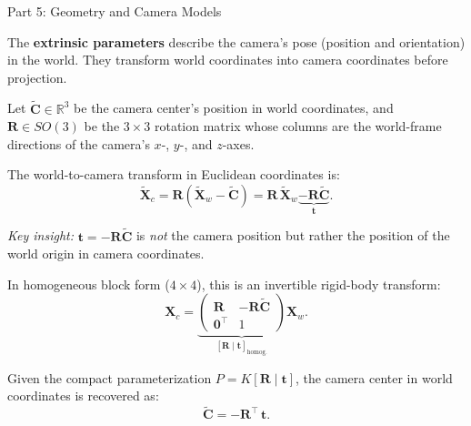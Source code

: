 \documentclass[letterpaper]{article}
\begin{document}
\begin{notes}{Part 5: Geometry and Camera Models}


The \textbf{extrinsic parameters} describe the camera's pose (position and
orientation) in the world.  They transform world coordinates into camera
coordinates before projection.

Let $\widetilde{\mathbf{C}} \in \mathbb{R}^3$ be the camera center's
position in world coordinates, and $\mathbf{R} \in SO(3)$ be the
$3\times 3$ rotation matrix whose columns are the world-frame directions
of the camera's $x$-, $y$-, and $z$-axes.

The world-to-camera transform in Euclidean coordinates is:
\begin{equation}
  \widetilde{\mathbf{X}}_c
  = \mathbf{R}\!\left(\widetilde{\mathbf{X}}_w - \widetilde{\mathbf{C}}\right)
  = \mathbf{R}\,\widetilde{\mathbf{X}}_w \underbrace{- \mathbf{R}\widetilde{\mathbf{C}}}_{\mathbf{t}}.
\end{equation}

\textit{Key insight:} $\mathbf{t} = -\mathbf{R}\widetilde{\mathbf{C}}$
is \emph{not} the camera position but rather the position of the world
origin in camera coordinates.

In homogeneous block form ($4\times 4$), this is an invertible rigid-body
transform:
\begin{equation}
  \mathbf{X}_c
  = \underbrace{\begin{pmatrix} \mathbf{R} & -\mathbf{R}\widetilde{\mathbf{C}} \\
                  \mathbf{0}^\top & 1 \end{pmatrix}}_{[\mathbf{R}\mid\mathbf{t}]_{\text{homog.}}}
    \mathbf{X}_w.
\end{equation}


Given the compact parameterization $P = K[\mathbf{R}\mid\mathbf{t}]$,
the camera center in world coordinates is recovered as:
\begin{equation}
  \widetilde{\mathbf{C}} = -\mathbf{R}^\top\,\mathbf{t}.
\end{equation}




\end{notes}
\end{document}
